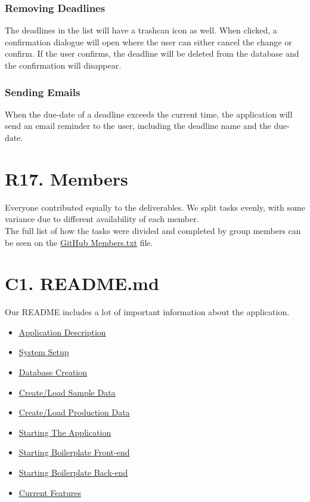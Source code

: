 \documentclass[12pt, a4paper]{article}
\begin{document}
\subsubsection*{Removing Deadlines}
The deadlines in the list will have a trashcan icon as well. When clicked, a confirmation dialogue will open where the user can either cancel the change or confirm. If the user confirms, the deadline will be deleted from the database and the confirmation will disappear.
\subsubsection*{Sending Emails}
When the due-date of a deadline exceeds the current time, the application will send an email reminder to the user, including the deadline name and the due-date.
\section*{R17. Members}
Everyone contributed equally to the deliverables. We split tasks evenly, with some variance due to different availability of each member.\\

The full list of how the tasks were divided and completed by group members can be seen on the \underline{\href{https://github.com/Kggupta/DegreeMap/blob/main/Members.txt}{GitHub Members.txt}} file.
\section*{C1. README.md}
Our README includes a lot of important information about the application.
\begin{itemize}
    \item \underline{\href{https://github.com/Kggupta/DegreeMap\#degreemap}{Application Description}}
    \item \underline{\href{https://github.com/Kggupta/DegreeMap\#2-create-a-local-instance-of-the-database}{System Setup}}
    \item \underline{\href{https://github.com/Kggupta/DegreeMap\#3-populate-database}{Database Creation}}
    \item \underline{\href{https://github.com/Kggupta/DegreeMap\#31-sample}{Create/Load Sample Data}}
    \item \underline{\href{https://github.com/Kggupta/DegreeMap\#32-production}{Create/Load Production Data}}
    \item \underline{\href{https://github.com/Kggupta/DegreeMap\#4-running-the-application}{Starting The Application}}
    \item \underline{\href{https://github.com/Kggupta/DegreeMap\#41-running-the-client}{Starting Boilerplate Front-end}}
    \item \underline{\href{https://github.com/Kggupta/DegreeMap\#42-running-the-server}{Starting Boilerplate Back-end}}
    \item \underline{\href{https://github.com/Kggupta/DegreeMap\#5-current-features}{Current Features}}
\end{itemize}
\end{document}
